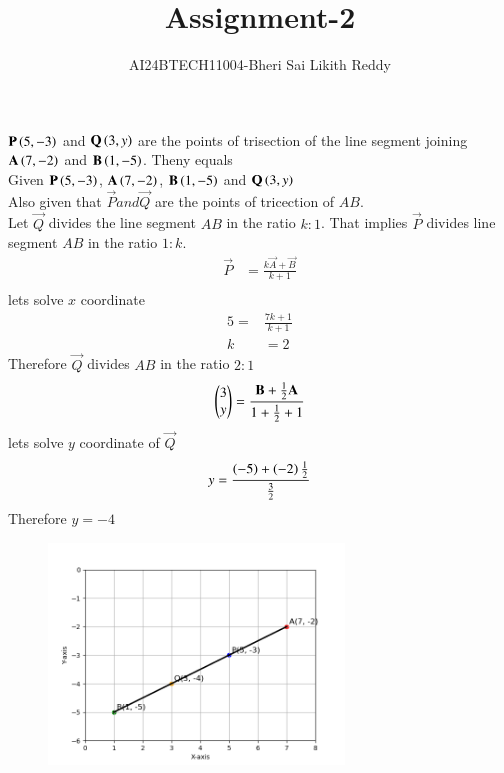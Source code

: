 \documentclass[journal]{IEEEtran}
\begin{document}

\onecolumn
\newpage
\title{Assignment-2}
\author{AI24BTECH11004-Bheri Sai Likith Reddy}
\maketitle
 $\mathbf{P}\left(5,-3\right)$ and $\mathbf{Q}\left(3,y\right)$ are the points of trisection of the line segment joining $\mathbf{A}\left(7,-2\right)$ and $\mathbf{B}\left(1,-5\right)$. Theny equals\\
\solution Given $\mathbf{P}\left(5,-3\right)$, $\mathbf{A}\left(7,-2\right)$, $\mathbf{B}\left(1,-5\right)$ and $\mathbf{Q}\left(3,y\right)$\\
Also given that $\vec{P} and \vec{Q} $ are the points of tricection of $AB$.\\
Let $\vec{Q}$ divides the line segment $AB$ in the ratio $k:1$.
That implies $\vec{P}$ divides line segment $AB$ in the ratio $1:k$.
\begin{align*}
	\vec{P}&= \frac{k\vec{A} +\vec{B}}{k+1}\\
\end{align*}
lets solve $x$ coordinate
\begin{align*}
	5=&\frac{7k+1}{k+1}\\
	k&=2
\end{align*}
Therefore $\vec{Q}$ divides $AB$ in the ratio $2:1$\\
\begin{align*}
	\begin{pmatrix}3\\ y\end{pmatrix}&=\frac{\mathbf{B} +\frac{1}{2}\mathbf{A} }{1+\frac{1}{2}+1 }\\
\end{align*}
lets solve $y$ coordinate of $\vec{Q}$ 
\begin{align*}
	y&=\frac{\left(-5\right)+\left(-2\right)\frac{1}{2}}{\frac{3}{2}}\\
\end{align*}
Therefore $y=-4$
\begin{figure}[h]
    \centering
    \includegraphics[width=0.7\textwidth]{Fig/Figure_1.png}
\end{figure}
\end{document}
